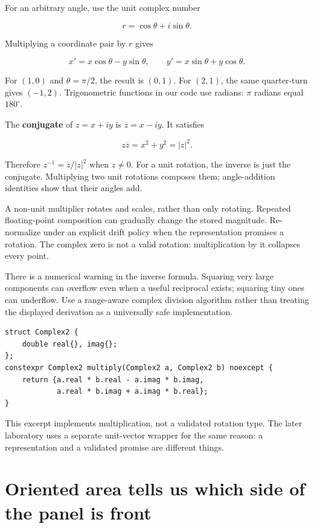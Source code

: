 For an arbitrary angle, use the unit complex number

\[
r=\cos\theta+i\sin\theta.
\]

Multiplying a coordinate pair by \(r\) gives

\[
x'=x\cos\theta-y\sin\theta,\qquad
y'=x\sin\theta+y\cos\theta.
\]

For \((1,0)\) and \(\theta=\pi/2\), the result is \((0,1)\). For \((2,1)\), the same quarter-turn gives \((-1,2)\). Trigonometric functions in our code use radians: \(\pi\) radians equal \(180^\circ\).

The \textbf{conjugate} of \(z=x+iy\) is \(\overline z=x-iy\). It satisfies

\[
z\overline z=x^2+y^2=|z|^2.
\]

Therefore \(z^{-1}=\overline z/|z|^2\) when \(z\ne0\). For a unit rotation, the inverse is just the conjugate. Multiplying two unit rotations composes them; angle-addition identities show that their angles add.

A non-unit multiplier rotates and scales, rather than only rotating. Repeated floating-point composition can gradually change the stored magnitude. Re-normalize under an explicit drift policy when the representation promises a rotation. The complex zero is not a valid rotation: multiplication by it collapses every point.

There is a numerical warning in the inverse formula. Squaring very large components can overflow even when a useful reciprocal exists; squaring tiny ones can underflow. Use a range-aware complex division algorithm rather than treating the displayed derivation as a universally safe implementation.

\begin{verbatim}
struct Complex2 {
    double real{}, imag{};
};
constexpr Complex2 multiply(Complex2 a, Complex2 b) noexcept {
    return {a.real * b.real - a.imag * b.imag,
            a.real * b.imag + a.imag * b.real};
}
\end{verbatim}

This excerpt implements multiplication, not a validated rotation type. The later laboratory uses a separate unit-vector wrapper for the same reason: a representation and a validated promise are different things.

\section{Oriented area tells us which side of the panel is front}\label{01-foundations-i-ch017-oriented-area-tells-us-which-side-of-the-panel-is-front}

